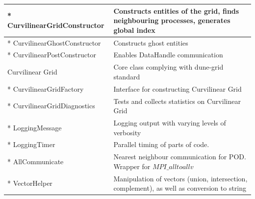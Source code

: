\begin{tabularx}{\textwidth}{ l | X }
  * CurvilinearGridConstructor        & Constructs entities of the grid, finds neighbouring processes, generates global index \\ \hline
  * CurvilinearGhostConstructor       & Constructs ghost entities \\ \hline
  * CurvilinearPostConstructor        & Enables DataHandle communication \\ \hline
  Curvilinear Grid                    & Core class complying with dune-grid standard \\ \hline
  * CurvilinearGridFactory            & Interface for constructing Curvilinear Grid \\ \hline
  * CurvilinearGridDiagnostics        & Tests and collects statistics on Curvilinear Grid \\ \hline
  * LoggingMessage                    & Logging output with varying levels of verbosity \\ \hline
  * LoggingTimer                      & Parallel timing of parts of code. \\ \hline
  * AllCommunicate                    & Nearest neighbour communication for POD. Wrapper for $MPI\_alltoallv$ \\ \hline
  * VectorHelper                      & Manipulation of vectors (union, intersection, complement), as well as conversion to string \\ \hline
\end{tabularx}
